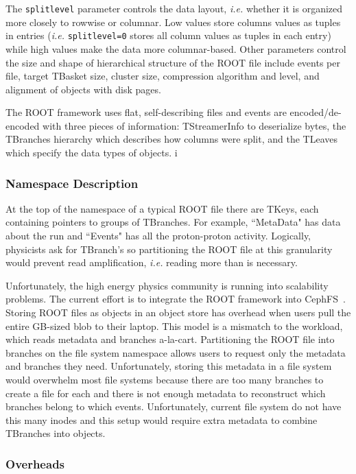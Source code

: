 The \texttt{splitlevel} parameter controls the data layout, {\it i.e.}
whether it is organized more closely to rowwise or columnar. Low values
store columns values as tuples in entries ({\it i.e.} \texttt{splitlevel=0}
stores all column values as tuples in each entry) while high values make
the data more columnar-based. Other parameters control the size and shape
of hierarchical structure of the ROOT file include events per file, target
TBasket size, cluster size, compression algorithm and level, and alignment
of objects with disk pages.

The ROOT framework uses flat, self-describing files and events are
encoded/de-encoded with three pieces of information: TStreamerInfo to
deserialize bytes, the TBranches hierarchy which describes how columns were
split, and the TLeaves which specify the data types of objects. i

\subsubsection{Namespace Description}

At the top of the namespace of a typical ROOT file there are TKeys, each
containing pointers to groups of TBranches. For example, ``MetaData" has data
about the run and ``Events" has all the proton-proton activity. Logically,
physicists ask for TBranch's so partitioning the ROOT file at this granularity
would prevent read amplification, {\it i.e.} reading more than is necessary.

Unfortunately, the high energy physics community is running into scalability
problems.  The current effort is to integrate the ROOT framework into
CephFS~\cite{weil:osdi2006-ceph}.  Storing ROOT files as objects in an object
store has overhead when users pull the entire GB-sized blob to their laptop.
This model is a mismatch to the workload, which reads metadata and branches
a-la-cart. Partitioning the ROOT file into branches on the file system
namespace allows users to request only the metadata and branches they need.
Unfortunately, storing this metadata in a file system would overwhelm most file
systems because there are too many branches to create a file for each and there
is not enough metadata to reconstruct which branches belong to which events.
Unfortunately, current file system do not have this many inodes and this setup
would require extra metadata to combine TBranches into objects.

\subsubsection{Overheads}

